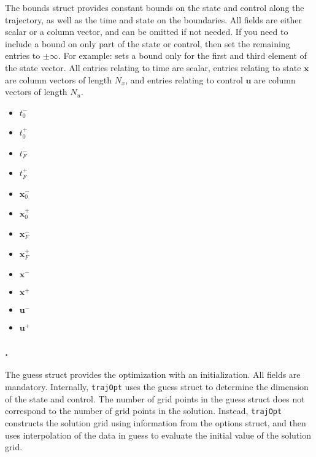 The bounds struct provides constant bounds on the state and control along the trajectory, as well as the time and state on the boundaries. All fields are either scalar or a column vector, and can be omitted if not needed. If you need to include a bound on only part of the state or control, then set the remaining entries to $\pm\infty$. For example:  sets a bound only for the first and third element of the state vector. All entries relating to time are scalar, entries relating to state $\bm{x}$ are column vectors of length $N_x$, and entries relating to control $\bm{u}$ are column vectors of length $N_u$.
\begin{itemize} \setlength\itemsep{-0.1em}
\item {}\tc{ = }$t_0^-$ 
\item {}\tc{ = }$t_0^+$ 
\item {}\tc{ = }$t_F^-$ 
\item {}\tc{ = }$t_F^+$ 
\item {}\tc{ = }$\bm{x}_0^-$ 
\item {}\tc{ = }$\bm{x}_0^+$ 
\item {}\tc{ = }$\bm{x}_F^-$ 
\item {}\tc{ = }$\bm{x}_F^+$ 
\item {}\tc{ = }$\bm{x}^-$ 
\item {}\tc{ = }$\bm{x}^+$ 
\item {}\tc{ = }$\bm{u}^-$ 
\item {}\tc{ = }$\bm{u}^+$ 
\end{itemize}
 

\subsubsection*{.}

The guess struct provides the optimization with an initialization. All fields are mandatory. Internally, \texttt{trajOpt} uses the guess struct to determine the dimension of the state and control. The number of grid points in the guess struct does not correspond to the number of grid points in the solution. Instead, \texttt{trajOpt} constructs the solution grid using information from the options struct, and then uses interpolation of the data in guess to evaluate the initial value of the solution grid.

